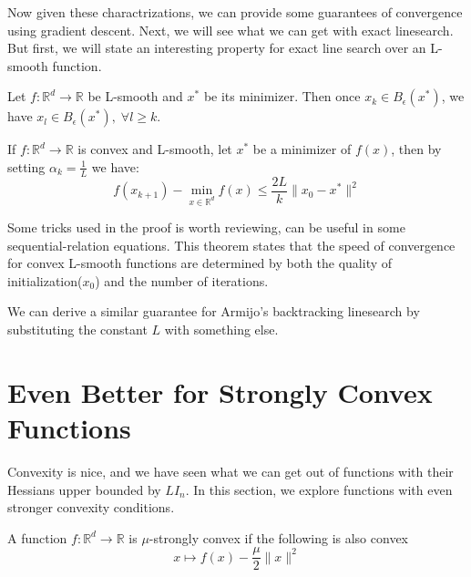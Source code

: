 Now given these charactrizations, we can provide some guarantees of convergence using gradient descent. Next, we will see what we can get with exact linesearch. But first, we will state an interesting property for exact line search over an L-smooth function.

\begin{proposition}
    Let $f:\mathbb{R}^d \rightarrow \mathbb{R}$ be L-smooth and $x^*$ be its minimizer. Then once $x_k \in B_\epsilon(x^*)$, we have $x_l \in B_\epsilon(x^*),\; \forall l \geq k$.
\end{proposition}

\begin{theorem}\label{thm:ConvexLSmoothConvergenceGuaranteeExactLinesearch}
    If $f:\mathbb{R}^d \rightarrow \mathbb{R}$ is convex and L-smooth, let $x^*$ be a minimizer of $f(x)$, then by setting $\alpha_k = \frac{1}{L}$ we have:
    \begin{equation*}
        f(x_{k+1}) - \min_{x \in \mathbb{R}^d}f(x) \leq \frac{2L}{k} \| x_0 - x^* \|^2
    \end{equation*}
\end{theorem}
\begin{note}
    Some tricks used in the proof is worth reviewing, can be useful in some sequential-relation equations. This theorem states that the speed of convergence for convex L-smooth functions are determined by both the quality of initialization($x_0$) and the number of iterations.
\end{note}

\begin{corollary}
    We can derive a similar guarantee for Armijo's backtracking linesearch by substituting the constant $L$ with something else.
\end{corollary}


\section{Even Better for Strongly Convex Functions}
Convexity is nice, and we have seen what we can get out of functions with their Hessians upper bounded by $LI_n$. In this section, we explore functions with even stronger convexity conditions.

\begin{definition}
    A function $f: \mathbb{R}^d \rightarrow \mathbb{R}$ is $\mu$-strongly convex if the following is also convex
    \begin{equation*}
        x \mapsto f(x) - \frac{\mu}{2}\|x\|^2
    \end{equation*}
\end{definition}

